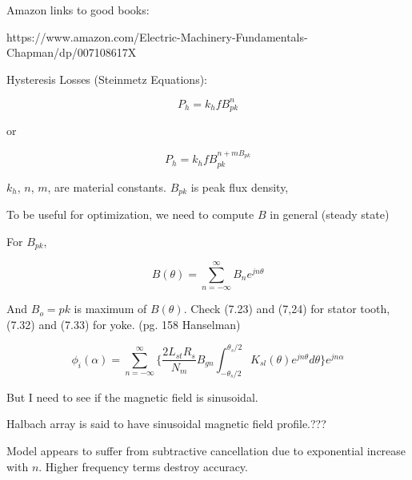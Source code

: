 \documentclass[10pt]{article}
\begin{document}
Amazon links to good books:

https://www.amazon.com/Electric-Machinery-Fundamentals-Chapman/dp/007108617X

Hysteresis Losses (Steinmetz Equations):

\begin{equation}
P_h = k_hfB_{pk}^n
\end{equation}

or 

\begin{equation}
P_h = k_hfB_{pk}^{n+mB_{pk}}
\end{equation}

$k_h$, $n$, $m$, are material constants. $B_{pk}$ is peak flux density,

To be useful for optimization, we need to compute $B$ in general (steady state)

For $B_{pk}$,

\begin{equation}
B(\theta) = \sum_{n=-\infty}^{\infty}B_ne^{jn\theta}
\end{equation}

And $B_o={pk}$ is maximum of $B(\theta)$. Check (7.23) and (7,24) for stator tooth, (7.32) and (7.33) for yoke. (pg. 158 Hanselman)

\begin{equation}
\phi_i(\alpha) = \sum_{n=-\infty}^{\infty}\bigg\{\frac{2L_{st}R_s}{N_m}B_{gn}\int_{-\theta_s/2}^{\theta_s/2}K_{sl}(\theta)e^{jn\theta}d\theta{}\bigg\}e^{jn\alpha}
\end{equation}

But I need to see if the magnetic field is sinusoidal.

Halbach array is said to have sinusoidal magnetic field profile.???

Model appears to suffer from subtractive cancellation due to exponential increase with $n$. Higher frequency terms destroy accuracy. 
\end{document}
